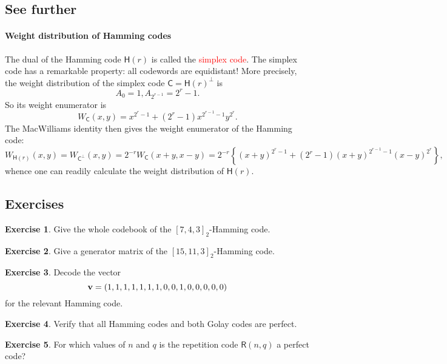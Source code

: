 \documentclass[a4paper, 11pt, openany]{book}
\numberwithin{equation}{section}
\theoremstyle{plain}
\theoremstyle{definition}
\newtheorem{exercise}   {Exercise}  [section]
\newcommand{\Important}[1]{\textcolor{red}{#1}}
\newcommand{\code}[1]{\mathsf{#1}}
\newcommand{\Repetition}            {\code{R}}
\newcommand{\Hamming}               {\code{H}}
\begin{document}
\subsection{See further}

\paragraph{Weight  distribution of Hamming codes}
The dual of the Hamming code $\Hamming(r)$ is called the \Important{simplex code}. The simplex code has a remarkable property: all codewords are equidistant! More precisely, the weight distribution of the simplex code $\code{C} = \Hamming(r)^\perp$ is
\[
    A_0 = 1, A_{2^{r-1}} = 2^r - 1.
\]
So its weight enumerator is
\[
    W_\code{C}(x,y) = x^{2^r - 1} + (2^r - 1) x^{2^{r-1} - 1} y^{2^r}.
\]
The MacWilliams identity then gives the weight enumerator of the Hamming code:
\[
    W_{\Hamming(r)}(x,y) = W_{\code{C}^\perp}(x,y) = 2^{-r} W_\code{C}(x+y, x-y) = 2^{-r} \left\{ (x + y)^{2^r - 1} + (2^r - 1) (x + y)^{2^{r-1} - 1} (x-y)^{2^r} \right\},
\]
whence one can readily calculate the weight distribution of $\Hamming(r)$.


\subsection{Exercises}


\begin{exercise}
Give the whole codebook of the $[7,4,3]_2$-Hamming code.
\end{exercise}

\begin{exercise}
Give a generator matrix of the $[15,11,3]_2$-Hamming code.
\end{exercise}

\begin{exercise}
Decode the vector 
\[
    {\bf v} = (1,1,1,1,1,1,1,0,0,1,0,0,0,0,0)
\]
for the relevant Hamming code.
\end{exercise}

\begin{exercise}
Verify that all Hamming codes and both Golay codes are perfect.
\end{exercise}






\begin{exercise}
For which values of $n$ and $q$ is the repetition code $\Repetition(n,q)$ a perfect code?
\end{exercise}
\end{document}
